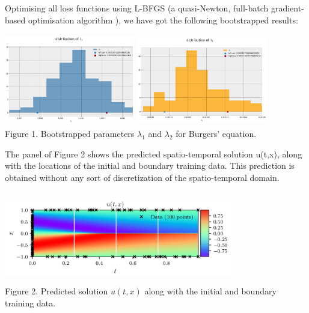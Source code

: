 \documentclass{beamer}
\begin{document}
\begin{frame}

Optimising all loss functions using L-BFGS (a quasi-Newton, full-batch gradient-based optimisation algorithm \cite{Liu1989Nocedal}), we have got the following bootstrapped results:

\begin{center}
\includegraphics[width = 5.7cm , height = 4cm]{02-presentation-v1/images/l1_confidence.png}
\includegraphics[width = 5.7cm , height = 4cm]{02-presentation-v1/images/l2_confidence.png}
\\
\caption{Figure 1. Bootstrapped parameters $\lambda_1$ and $\lambda_2$ for Burgers' equation.}
\end{center}
\end{frame}

\begin{frame}

The panel of Figure 2 shows the predicted spatio-temporal solution u(t,x), along with the locations of the initial and boundary training data. This prediction is obtained without any sort of discretization of the spatio-temporal domain. 

\begin{center}
\includegraphics[width = 10cm , height = 4cm]{02-presentation-v1/images/predicted_sol_burgers.png}
\\
\caption{Figure 2. Predicted solution $u(t,x)$ along with the initial and boundary training data.}
\end{center}

\end{frame}
\end{document}
